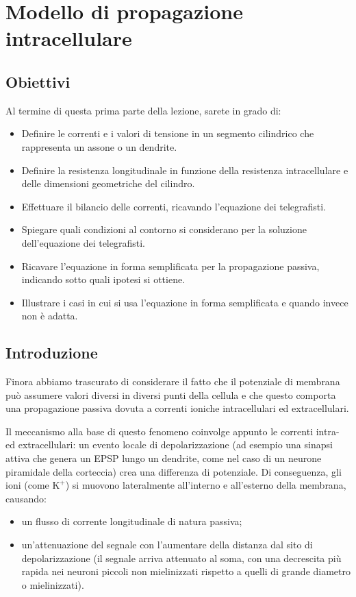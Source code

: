 \chapter{Modello di propagazione \\ intracellulare}

\section*{Obiettivi}
Al termine di questa prima parte della lezione, sarete in grado di:
\begin{itemize}
    \item Definire le correnti e i valori di tensione in un segmento cilindrico che rappresenta un assone o un dendrite.
    \item Definire la resistenza longitudinale in funzione della resistenza intracellulare e delle dimensioni geometriche del cilindro.
    \item Effettuare il bilancio delle correnti, ricavando l'equazione dei telegrafisti.
    \item Spiegare quali condizioni al contorno si considerano per la soluzione dell'equazione dei telegrafisti.
    \item Ricavare l'equazione in forma semplificata per la propagazione passiva, indicando sotto quali ipotesi si ottiene.
    \item Illustrare i casi in cui si usa l'equazione in forma semplificata e quando invece non è adatta.
\end{itemize}

\section{Introduzione}
Finora abbiamo trascurato di considerare il fatto che il potenziale di membrana può assumere valori diversi in diversi punti della cellula e che questo comporta una propagazione passiva dovuta a correnti ioniche intracellulari ed extracellulari.

Il meccanismo alla base di questo fenomeno coinvolge appunto le correnti intra- ed extracellulari: un evento locale di depolarizzazione (ad esempio una sinapsi attiva che genera un EPSP lungo un dendrite, come nel caso di un neurone piramidale della corteccia) crea una differenza di potenziale. Di conseguenza, gli ioni (come $\text{K}^+$) si muovono lateralmente all'interno e all'esterno della membrana, causando:
\begin{itemize}
    \item un flusso di corrente longitudinale di natura passiva;
    \item un'attenuazione del segnale con l'aumentare della distanza dal sito di depolarizzazione (il segnale arriva attenuato al soma, con una decrescita più rapida nei neuroni piccoli non mielinizzati rispetto a quelli di grande diametro o mielinizzati).
\end{itemize}

